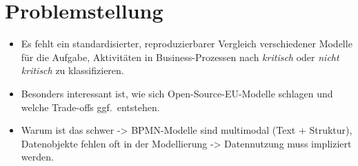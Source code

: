 \section{Problemstellung}\label{sec:problemstellung}
\begin{itemize}
    \item Es fehlt ein standardisierter, reproduzierbarer Vergleich verschiedener Modelle für die Aufgabe, Aktivitäten in Business-Prozessen nach \emph{kritisch} oder \emph{nicht kritisch} zu klassifizieren.
    \item Besonders interessant ist, wie sich Open-Source-EU-Modelle schlagen und welche Trade-offs ggf.\ entstehen.
    \item Warum ist das schwer -> BPMN-Modelle sind multimodal (Text + Struktur), Datenobjekte fehlen oft in der Modellierung -> Datennutzung muss impliziert werden.
\end{itemize}
